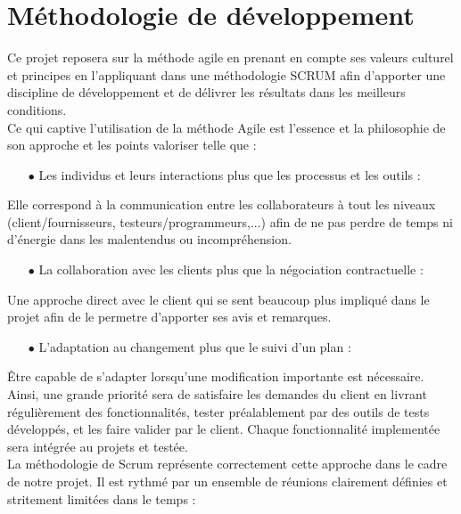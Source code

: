 \documentclass[a4paper,11pt,french]{article}
\begin{document}
\newpage

\section{Méthodologie de développement}

Ce projet reposera sur la méthode agile en prenant en compte ses valeurs culturel et principes en l'appliquant dans une méthodologie SCRUM afin d'apporter une discipline de développement et de délivrer les résultats dans les meilleurs conditions. \\

Ce qui captive l'utilisation de la méthode Agile est l'essence et la philosophie de son approche et les points valoriser telle que : \\
\begin{itemize}
	\item [$\bullet$] Les individus et leurs interactions plus que les processus et les outils :
\end{itemize}
Elle correspond à la communication entre les collaborateurs à tout les niveaux (client/fournisseurs, testeurs/programmeurs,...) afin de ne pas perdre de temps ni d'énergie dans les malentendus ou incompréhension. \\
\begin{itemize}
	\item [$\bullet$] La collaboration avec les clients plus que la négociation contractuelle :
\end{itemize}
Une approche direct avec le client qui se sent beaucoup plus impliqué dans le projet afin de le permetre d'apporter ses avis et remarques.\\
\begin{itemize}
	\item [$\bullet$] L’adaptation au changement plus que le suivi d’un plan : 
\end{itemize}
Être capable de s'adapter lorsqu'une modification importante est nécessaire.\\

Ainsi, une grande priorité sera de satisfaire les demandes du client en livrant régulièrement des fonctionnalités, tester préalablement par des outils de tests développés, et les faire valider par le client. Chaque fonctionnalité implementée sera intégrée au projets et testée.\\

La méthodologie de Scrum représente correctement cette approche dans le cadre de notre projet. Il est rythmé par un ensemble de réunions clairement définies et stritement limitées dans le temps :\\
\end{document}
